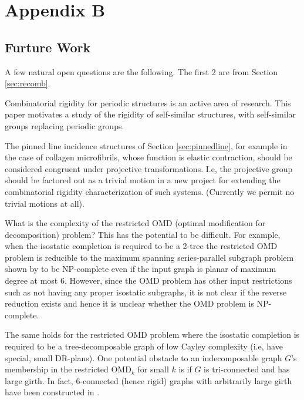 \section{Appendix B}
\label{sec:appendix:b}

\subsection{Furture Work}
\label{sec:futurework}
A few natural  open questions are the following.
The first 2 are from Section \ref{sec:recomb}.

\begin{openproblem}
    Combinatorial rigidity for
    periodic structures is an active area of research. This paper motivates
    a study of the rigidity of self-similar structures,
    with self-similar groups replacing periodic groups.
\end{openproblem}

\begin{openproblem}
    The pinned line incidence structures of Section \ref{sec:pinnedline},
    for example in the case of collagen microfibrils, whose function is
    elastic contraction, should be considered
    congruent under projective transformations. I.e, the projective group
    should be factored out as a trivial motion in a new project for
    extending the combinatorial rigidity characterization of such systems.
    (Currently we permit no trivial motions at all).
\end{openproblem}

\begin{openproblem}
What is the complexity of the restricted OMD (optimal modification for
decomposition) problem?
This has the potential to be difficult. For example, when the
isostatic completion is required to be a 2-tree the restricted OMD
problem is reducible to the maximum spanning series-parallel subgraph
problem shown by \cite{cai1993spanning} to be NP-complete even if the input
graph is planar of maximum degree at most 6. However, since the OMD
problem has other input restrictions such as not having any proper
isostatic subgraphs, it is not clear if the reverse reduction exists
and hence it is unclear whether the OMD problem is NP-complete.

The same holds for the restricted OMD problem where the isostatic
completion is required to be a tree-decomposable graph of low
Cayley complexity (i.e, have special, small DR-plans). One potential
obstacle to an indecomposable graph $G$'s membership in the restricted
OMD$_k$ for small $k$ is if $G$ is tri-connected and has large girth.
In fact, 6-connected (hence rigid) graphs with arbitrarily large girth
have been constructed in \cite{servatius2000rigidity}.
\end{openproblem}

